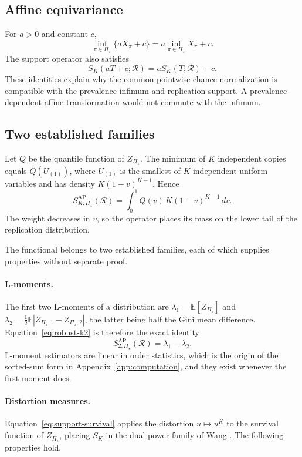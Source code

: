 \documentclass[11pt]{article}
\newcommand{\Regime}{\mathcal{R}}
\newcommand{\PSet}{\Pi_\star}
\newcommand{\E}{\mathbb{E}}
\theoremstyle{remark}
\begin{document}
\subsection{Affine equivariance}

For $a>0$ and constant $c$,
\[
\inf_{\pi\in\PSet}\{aX_\pi+c\}
=
a\inf_{\pi\in\PSet}X_\pi+c.
\]
The support operator also satisfies
\[
S_K(aT+c;\Regime)
=
aS_K(T;\Regime)+c.
\]
These identities explain why the common pointwise chance normalization is compatible with the prevalence infimum and replication support. A prevalence-dependent affine transformation would not commute with the infimum.

\subsection{Two established families}
\label{app:families}

Let $Q$ be the quantile function of $Z_{\PSet}$. The minimum of $K$ independent copies equals $Q(U_{(1)})$, where $U_{(1)}$ is the smallest of $K$ independent uniform variables and has density $K(1-v)^{K-1}$. Hence
\begin{equation}
S_{K,\PSet}^{\mathrm{AP}}(\Regime)
=
\int_0^1
Q(v)\,K(1-v)^{K-1}\,dv.
\label{eq:quantile-weight}
\end{equation}
The weight decreases in $v$, so the operator places its mass on the lower tail of the replication distribution.

The functional belongs to two established families, each of which supplies properties without separate proof.

\paragraph{L-moments.}
The first two L-moments of a distribution \cite{hosking1990lmoments} are $\lambda_1=\E[Z_{\PSet}]$ and $\lambda_2=\tfrac12\E|Z_{\PSet,1}-Z_{\PSet,2}|$, the latter being half the Gini mean difference. Equation~\eqref{eq:robust-k2} is therefore the exact identity
\[
S_{2,\PSet}^{\mathrm{AP}}(\Regime)
=
\lambda_1-\lambda_2 .
\]
L-moment estimators are linear in order statistics, which is the origin of the sorted-sum form in Appendix~\ref{app:computation}, and they exist whenever the first moment does.

\paragraph{Distortion measures.}
Equation~\eqref{eq:support-survival} applies the distortion $u\mapsto u^{K}$ to the survival function of $Z_{\PSet}$, placing $S_K$ in the dual-power family of Wang \cite{wang1996premium}. The following properties hold.
\end{document}
